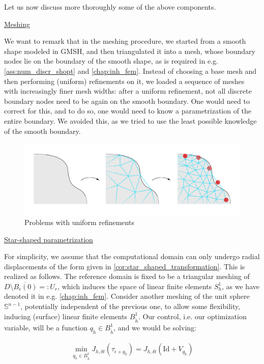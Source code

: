 \documentclass[english,a4paper,9pt,oneside]{scrbook}	%
\theoremstyle{break}
\theoremstyle{remark}
\newcommand{\mS}{\mathbb{S}^{n-1}}
\newcommand{\id}{\text{Id}}
\newcommand{\eps}{\epsilon}
\begin{document}
Let us now discuss more thoroughly some of the above components.

\underline{Meshing}

We want to remark that in the meshing procedure, we started from a smooth shape modeled in GMSH, and then triangulated it into a mesh, whose boundary nodes lie on the boundary of the smooth shape, as is required in e.g. \cref{ass:num_discr_shopt} and \cref{chap:inh_fem}. Instead of choosing a base mesh and then performing (uniform) refinements on it, we loaded a sequence of meshes with increasingly finer mesh widths: after a uniform refinement, not all discrete boundary nodes need to be again on the smooth boundary. One would need to correct for this, and to do so, one would need to know a parametrization of the entire boundary. We avoided this, as we tried to use the least possible knowledge of the smooth boundary.

\begin{figure}[H]
\centering
\includegraphics[width=0.75\columnwidth]{Images/UniformRefinement.pdf}
\caption{Problems with uniform refinements}\label{fig:uniform_refinement}
\end{figure}

\underline{Star-shaped parametrization}

For simplicity, we assume that the computational domain can only undergo radial displacements of the form given in \cref{cor:star_shaped_transformation}. This is realized as follows. The reference domain is fixed to be a triangular meshing of $D\setminus \overline{B_\epsilon(0)}=:U_r$, which induces the space of linear finite elements $S^1_h$, as we have denoted it in e.g. \cref{chap:inh_fem}. Consider another meshing of the unit sphere $\mS$, potentially independent of the previous one, to allow some flexibility, inducing (surface) linear finite elements $B^1_{\tilde{h}}$. Our control, i.e. our optimization variable, will be a function $ q_{\tilde{h}} \in B^1_{\tilde{h}}$, and we would be solving:

\begin{align*}
	\min_{q_{\tilde{h}} \in B^1_{\tilde{h}}} J_{h,\delta t}(\tau_{\eps+q_{\tilde{h}}}) = J_{h,\delta t }(\id  + V_{q_{\tilde{h}}})
\end{align*}
\end{document}
